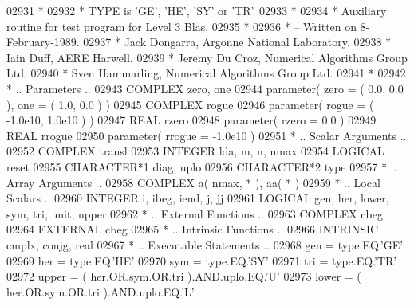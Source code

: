 \begin{DoxyCode}
02931 \textcolor{comment}{*}
02932 \textcolor{comment}{*  TYPE is 'GE', 'HE', 'SY' or 'TR'.}
02933 \textcolor{comment}{*}
02934 \textcolor{comment}{*  Auxiliary routine for test program for Level 3 Blas.}
02935 \textcolor{comment}{*}
02936 \textcolor{comment}{*  -- Written on 8-February-1989.}
02937 \textcolor{comment}{*     Jack Dongarra, Argonne National Laboratory.}
02938 \textcolor{comment}{*     Iain Duff, AERE Harwell.}
02939 \textcolor{comment}{*     Jeremy Du Croz, Numerical Algorithms Group Ltd.}
02940 \textcolor{comment}{*     Sven Hammarling, Numerical Algorithms Group Ltd.}
02941 \textcolor{comment}{*}
02942 \textcolor{comment}{*     .. Parameters ..}
02943       \textcolor{keywordtype}{COMPLEX}            zero, one
02944       parameter( zero = ( 0.0, 0.0 ), one = ( 1.0, 0.0 ) )
02945       \textcolor{keywordtype}{COMPLEX}            rogue
02946       parameter( rogue = ( -1.0e10, 1.0e10 ) )
02947       \textcolor{keywordtype}{REAL}               rzero
02948       parameter( rzero = 0.0 )
02949       \textcolor{keywordtype}{REAL}               rrogue
02950       parameter( rrogue = -1.0e10 )
02951 \textcolor{comment}{*     .. Scalar Arguments ..}
02952       \textcolor{keywordtype}{COMPLEX}            transl
02953       \textcolor{keywordtype}{INTEGER}            lda, m, n, nmax
02954       \textcolor{keywordtype}{LOGICAL}            reset
02955       \textcolor{keywordtype}{CHARACTER*1}        diag, uplo
02956       \textcolor{keywordtype}{CHARACTER*2}        type
02957 \textcolor{comment}{*     .. Array Arguments ..}
02958       \textcolor{keywordtype}{COMPLEX}            a( nmax, * ), aa( * )
02959 \textcolor{comment}{*     .. Local Scalars ..}
02960       \textcolor{keywordtype}{INTEGER}            i, ibeg, iend, j, jj
02961       \textcolor{keywordtype}{LOGICAL}            gen, her, lower, sym, tri, unit, upper
02962 \textcolor{comment}{*     .. External Functions ..}
02963       \textcolor{keywordtype}{COMPLEX}            cbeg
02964       \textcolor{keywordtype}{EXTERNAL}           cbeg
02965 \textcolor{comment}{*     .. Intrinsic Functions ..}
02966       \textcolor{keywordtype}{INTRINSIC}          cmplx, conjg, real
02967 \textcolor{comment}{*     .. Executable Statements ..}
02968       gen = type.EQ.\textcolor{stringliteral}{'GE'}
02969       her = type.EQ.\textcolor{stringliteral}{'HE'}
02970       sym = type.EQ.\textcolor{stringliteral}{'SY'}
02971       tri = type.EQ.\textcolor{stringliteral}{'TR'}
02972       upper = ( her.OR.sym.OR.tri ).AND.uplo.EQ.\textcolor{stringliteral}{'U'}
02973       lower = ( her.OR.sym.OR.tri ).AND.uplo.EQ.\textcolor{stringliteral}{'L'}

\end{DoxyCode}
